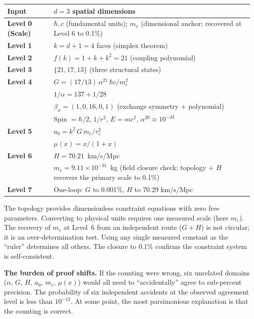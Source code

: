 \documentclass[aps,prd,preprint,superscriptaddress,showpacs,preprintnumbers,amsmath,amssymb,nofootinbib]{revtex4-2}
\begin{document}
\begin{center}
\renewcommand{\arraystretch}{1.3}
\begin{tabular}{@{}ll@{}}
\textbf{Input} & $d = 3$ spatial dimensions \\
\midrule
\textbf{Level 0 (Scale)} & $\hbar, c$ (fundamental units); $m_e$ (dimensional anchor; recovered at Level 6 to 0.1\%) \\
\textbf{Level 1} & $k = d + 1 = 4$ faces (simplex theorem) \\
\textbf{Level 2} & $f(k) = 1 + k + k^2 = 21$ (coupling polynomial) \\
\textbf{Level 3} & $\{21, 17, 13\}$ (three structural states) \\
\textbf{Level 4} & $G = (17/13)\,\alpha^{21}\,\hbar c/m_e^2$ \\
 & $1/\alpha = 137 + 1/28$ \\
 & $\beta_n = (1, 0, 16, 0, 1)$ (exchange symmetry + polynomial) \\
 & Spin $= \hbar/2$, $1/r^2$, $E = mc^2$, $\alpha^{20} \approx 10^{-43}$ \\
\textbf{Level 5} & $a_0 = k^2\,G\,m_e/r_e^2$ \\
 & $\mu(x) = x/(1+x)$ \\
\textbf{Level 6} & $H = 70.21$~km/s/Mpc \\
 & $m_e = 9.11 \times 10^{-31}$~kg (field closure check: topology + $H$ recovers the primary scale to 0.1\%) \\
\textbf{Level 7} & One-loop: $G$ to 0.001\%, $H$ to 70.29 km/s/Mpc \\
\end{tabular}
\end{center}

\noindent The topology provides dimensionless constraint equations with zero free parameters. Converting to physical units requires one measured scale (here $m_e$). The recovery of $m_e$ at Level~6 from an independent route ($G + H$) is not circular; it is an over-determination test. Using any single measured constant as the ``ruler'' determines all others. The closure to 0.1\% confirms the constraint system is self-consistent.

\textbf{The burden of proof shifts.} If the counting were wrong, six unrelated domains ($\alpha$, $G$, $H$, $a_0$, $m_e$, $\mu(x)$) would all need to ``accidentally'' agree to sub-percent precision. The probability of six independent accidents at the observed agreement level is less than $10^{-12}$. At some point, the most parsimonious explanation is that the counting is correct.
\end{document}
